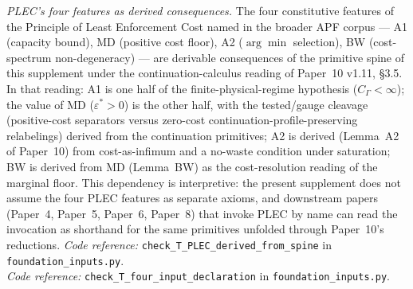 \documentclass[11pt]{article}
\newcommand{\coderef}[2]{\smallskip\noindent\textit{Code reference:} \texttt{#1} in \texttt{#2}.}
\begin{document}
\medskip
\noindent\textit{PLEC's four features as derived consequences.}\quad
The four constitutive features of the Principle of Least Enforcement Cost named in the broader APF corpus --- A1 (capacity bound), MD (positive cost floor), A2 ($\arg\min$ selection), BW (cost-spectrum non-degeneracy) --- are derivable consequences of the primitive spine of this supplement under the continuation-calculus reading of Paper~10 v1.11, \S3.5.  In that reading: A1 is one half of the finite-physical-regime hypothesis ($C_\Gamma < \infty$); the value of MD ($\varepsilon^* > 0$) is the other half, with the tested/gauge cleavage (positive-cost separators versus zero-cost continuation-profile-preserving relabelings) derived from the continuation primitives; A2 is derived (Lemma~A2 of Paper~10) from cost-as-infimum and a no-waste condition under saturation; BW is derived from MD (Lemma~BW) as the cost-resolution reading of the marginal floor.  This dependency is interpretive: the present supplement does not assume the four PLEC features as separate axioms, and downstream papers (Paper~4, Paper~5, Paper~6, Paper~8) that invoke PLEC by name can read the invocation as shorthand for the same primitives unfolded through Paper~10's reductions.
\coderef{check\_T\_PLEC\_derived\_from\_spine}{foundation\_inputs.py}\\
\coderef{check\_T\_four\_input\_declaration}{foundation\_inputs.py}
\end{document}
